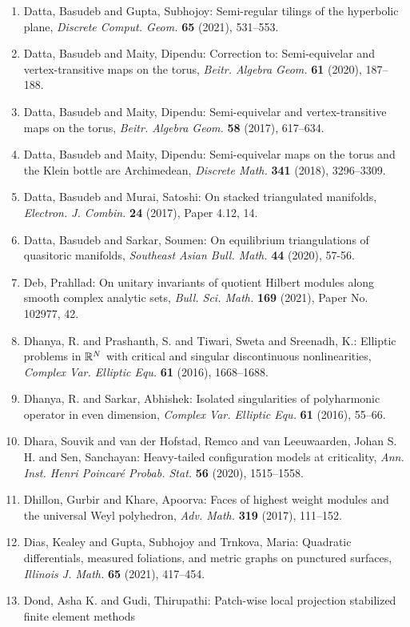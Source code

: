 \begin{enumerate}
\item Datta, Basudeb and Gupta, Subhojoy: Semi-regular tilings of the hyperbolic plane, \emph{Discrete Comput. Geom.} {\bf 65} (2021), 531--553.
\item Datta, Basudeb and Maity, Dipendu: Correction to: {S}emi-equivelar and vertex-transitive maps on
the torus, \emph{Beitr. Algebra Geom.} {\bf 61} (2020), 187--188.
\item Datta, Basudeb and Maity, Dipendu: Semi-equivelar and vertex-transitive maps on the torus, \emph{Beitr. Algebra Geom.} {\bf 58} (2017), 617--634.
\item Datta, Basudeb and Maity, Dipendu: Semi-equivelar maps on the torus and the {K}lein bottle are
{A}rchimedean, \emph{Discrete Math.} {\bf 341} (2018), 3296--3309.
\item Datta, Basudeb and Murai, Satoshi: On stacked triangulated manifolds, \emph{Electron. J. Combin.} {\bf 24} (2017), Paper 4.12, 14.
\item Datta, Basudeb and Sarkar, Soumen: On equilibrium triangulations of quasitoric manifolds, \emph{Southeast Asian Bull. Math.} {\bf 44} (2020), 57-56.
\item Deb, Prahllad: On unitary invariants of quotient {H}ilbert modules along
smooth complex analytic sets, \emph{Bull. Sci. Math.} {\bf 169} (2021), Paper No. 102977, 42.
\item Dhanya, R. and Prashanth, S. and Tiwari, Sweta and Sreenadh,
K.: Elliptic problems in {${\Bbb R}^N$} with critical and singular
discontinuous nonlinearities, \emph{Complex Var. Elliptic Equ.} {\bf 61} (2016), 1668--1688.
\item Dhanya, R. and Sarkar, Abhishek: Isolated singularities of polyharmonic operator in even
dimension, \emph{Complex Var. Elliptic Equ.} {\bf 61} (2016), 55--66.
\item Dhara, Souvik and van der Hofstad, Remco and van Leeuwaarden,
Johan S. H. and Sen, Sanchayan: Heavy-tailed configuration models at criticality, \emph{Ann. Inst. Henri Poincar\'{e} Probab. Stat.} {\bf 56} (2020), 1515--1558.
\item Dhillon, Gurbir and Khare, Apoorva: Faces of highest weight modules and the universal {W}eyl
polyhedron, \emph{Adv. Math.} {\bf 319} (2017), 111--152.
\item Dias, Kealey and Gupta, Subhojoy and Trnkova, Maria: Quadratic differentials, measured foliations, and metric
graphs on punctured surfaces, \emph{Illinois J. Math.} {\bf 65} (2021), 417--454.
\item Dond, Asha K. and Gudi, Thirupathi: Patch-wise local projection stabilized finite element methods

\end{enumerate}
